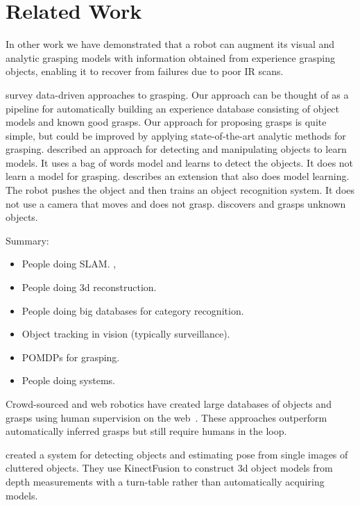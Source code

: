 \documentclass[graybox]{svmult}
\begin{document}
\section{Related Work}

\label{sec:relatedwork}

In other work we have demonstrated that a robot can augment its visual
and analytic grasping models with information obtained from experience
grasping objects, enabling it to recover from failures due to poor IR
scans.

\citet{bohg13} survey data-driven approaches to grasping.  Our
approach can be thought of as a pipeline for automatically building an
experience database consisting of object models and known good grasps.
Our approach for proposing grasps is quite simple, but could be
improved by applying state-of-the-art analytic methods for grasping.
\citet{ude12} described an approach for detecting and manipulating
objects to learn models.  It uses a bag of words model and learns to
detect the objects.  It does not learn a model for grasping.
\citet{schiebener13} describes an extension that also does model
learning.  The robot pushes the object and then trains an object
recognition system.  It does not use a camera that moves and does not
grasp.  \citet{schiebener12} discovers and grasps unknown objects.

Summary: 
\begin{itemize}
\item People doing SLAM.  \citet{wang07, gallagher09}, 
\item People doing 3d reconstruction.   \citet{krainin11, banta00}
\item People doing big databases for category recognition.  \citet{kent14a, kent14, lai11a, goldfeder09}
\item Object tracking in vision (typically surveillance).
\item POMDPs for grasping.  \citet{platt11, hsiao10}
\item People doing systems.  \citet{hudson12, ciocarlie14}
\end{itemize}


Crowd-sourced and web robotics have created large databases of objects
and grasps using human supervision on the web~\citep{kent14a, kent14}.
These approaches outperform automatically inferred grasps but still
require humans in the loop.

\citet{zhu14} created a system for detecting objects and estimating
pose from single images of cluttered objects.  They use KinectFusion
to construct 3d object models from depth measurements with a
turn-table rather than automatically acquiring models.
\end{document}
